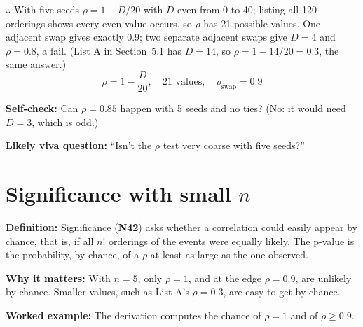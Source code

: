 \documentclass[11pt,a4paper,oneside,openany]{report}
\newcommand{\gl}[1]{\textbf{#1}}   %
\newcommand{\fdef}{\textbf{Definition:} }
\newcommand{\fwhy}{\par\textbf{Why it matters:} }
\newcommand{\fex}{\par\textbf{Worked example:} }
\newcommand{\fself}{\par\textbf{Self-check:} }
\newcommand{\fviva}{\par\textbf{Likely viva question:} }
\begin{document}
$\therefore$ With five seeds $\rho = 1 - D/20$ with $D$ even from 0 to 40; listing all 120 orderings shows every even value occurs, so $\rho$ has 21 possible values. One adjacent swap gives exactly 0.9; two separate adjacent swaps give $D = 4$ and $\rho = 0.8$, a fail. (List A in Section~5.1 has $D = 14$, so $\rho = 1 - 14/20 = 0.3$, the same answer.)
\[\boxed{\rho = 1 - \frac{D}{20}, \quad 21 \text{ values}, \quad \rho_{\mathrm{swap}} = 0.9}\]

\fself Can $\rho = 0.85$ happen with 5 seeds and no ties? (No: it would need $D = 3$, which is odd.)
\fviva ``Isn't the $\rho$ test very coarse with five seeds?''

\section{Significance with small $n$}
\fdef Significance (\gl{N42}) asks whether a correlation could easily appear by chance, that is, if all $n!$ orderings of the events were equally likely. The p-value is the probability, by chance, of a $\rho$ at least as large as the one observed.
\fwhy With $n = 5$, only $\rho = 1$, and at the edge $\rho = 0.9$, are unlikely by chance. Smaller values, such as List A's $\rho = 0.3$, are easy to get by chance.
\fex The derivation computes the chance of $\rho = 1$ and of $\rho \ge 0.9$.
\end{document}
